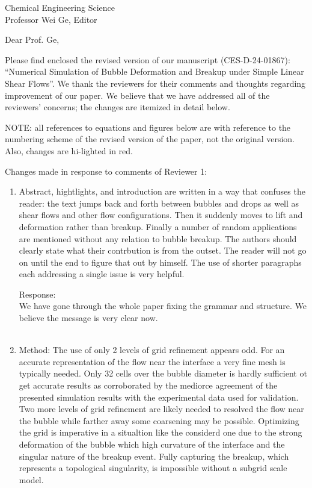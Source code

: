 \documentclass{letter}
\date{\today}
\begin{document}
\begin{letter}{
Chemical Engineering Science\\
Professor Wei Ge, Editor\\}

\opening{Dear Prof. Ge,}

Please find enclosed the revised version of our manuscript (CES-D-24-01867):
``Numerical Simulation of Bubble Deformation and Breakup under 
Simple Linear Shear Flows''.
We thank the reviewers for their comments and thoughts regarding improvement 
of our paper. We believe that we have addressed all of the reviewers’ 
concerns; the changes are itemized in detail below.

\par\noindent
NOTE: all references to equations and figures below are with
reference to the numbering scheme of the revised version of the paper,
not the original version.  Also, changes are hi-lighted in red.
\par\noindent

Changes made in response to comments of Reviewer 1: \begin{enumerate}
\item
\textsf
{Abstract, hightlights, and introduction are written in a way that confuses the reader: the text jumps back and forth between bubbles and drops as well as shear flows and other flow configurations. Then it suddenly moves to lift and deformation rather than breakup. Finally a number of random applications are mentioned without any relation to bubble breakup. The authors should clearly state what their contrbution is from the outset. The reader will not go on until the end to figure that out by himself. The use of shorter paragraphs each addressing a single issue is very helpful.}
\vspace{3 mm}

Response: \\
We have gone through the whole paper fixing the grammar and structure.  We believe the message is very clear now. \\
\\

\item
\textsf
{Method: The use of only 2 levels of grid refinement appears odd. For an accurate representation of the flow near the interface a very fine mesh is typically needed. Only 32 cells over the bubble diameter is hardly sufficient ot get accurate results as corroborated by the mediorce agreement of the presented simulation results with the experimental data used for validation. Two more levels of grid refinement are likely needed to resolved the flow near the bubble while farther away some coarsening may be possible. Optimizing the grid is imperative in a situaltion like the considerd one due to the strong deformation of the bubble which high curvature of the interface and the singular nature of the breakup event. Fully capturing the breakup, which represents a topological singularity, is impossible without a subgrid scale model.}
\vspace{3 mm}


\end{enumerate}
\end{letter}
\end{document}
